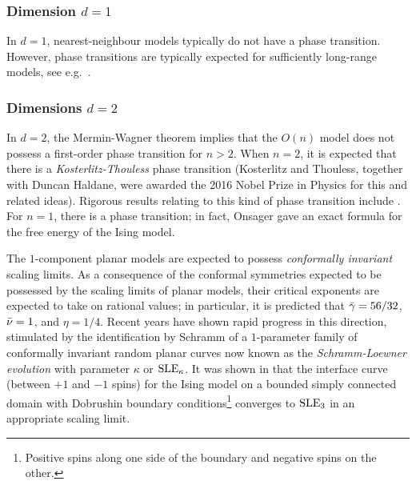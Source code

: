 \subsubsection{Dimension $d = 1$}

In $d = 1$, nearest-neighbour models typically do not have a phase transition.
However, phase transitions are typically expected for sufficiently long-range models,
see e.g.\ \cite{Dyso69}.

\subsubsection{Dimensions $d = 2$}

In $d = 2$, the Mermin-Wagner theorem \cite{MW66} implies that the $O(n)$ model does
not possess a first-order phase transition for $n > 2$. When $n = 2$, it is
expected that there is a \emph{Kosterlitz-Thouless} phase transition \cite{KT73}
(Kosterlitz and Thouless, together with Duncan Haldane, were awarded
the 2016 Nobel Prize in Physics for this and related ideas). Rigorous results relating
to this kind of phase transition include \cite{FS81,Falc12,Falc13}.
For $n = 1$, there is a phase transition; in fact, Onsager \cite{Onsager44} gave an
exact formula for the free energy of the Ising model.

The $1$-component planar models are expected to possess \emph{conformally invariant}
scaling limits. As a consequence of the conformal symmetries expected to be possessed
by the scaling limits of planar models, their critical exponents are expected to take
on rational values; in particular, it is predicted that $\bar\gamma = 56/32$, $\bar\nu = 1$,
and $\eta = 1/4$. Recent years have shown rapid progress in this direction, stimulated
by the identification by Schramm \cite{Schramm00} of a $1$-parameter family of
conformally invariant random planar curves now known as the \emph{Schramm-Loewner
evolution} with parameter $\kappa$ or ${\rm SLE}_\kappa$. It was shown in \cite{CDHKS14}
that the interface curve (between $+ 1$ and $-1$ spins) for the Ising model on a
bounded simply connected domain with Dobrushin boundary
conditions\footnote{Positive spins along one side of the
boundary and negative spins on the other.} converges to ${\rm SLE}_3$ in
an appropriate scaling limit.

